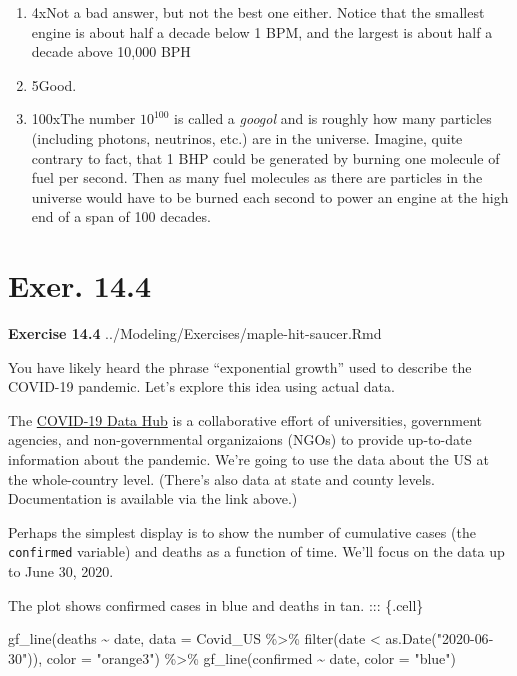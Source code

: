 \documentclass[
  letterpaper,
  DIV=11,
  numbers=noendperiod,
  oneside]{article}
\newenvironment{Shaded}{\begin{snugshade}}{\end{snugshade}}
\newcommand{\AttributeTok}[1]{\textcolor[rgb]{0.40,0.45,0.13}{#1}}
\newcommand{\FunctionTok}[1]{\textcolor[rgb]{0.28,0.35,0.67}{#1}}
\newcommand{\NormalTok}[1]{\textcolor[rgb]{0.00,0.23,0.31}{#1}}
\newcommand{\SpecialCharTok}[1]{\textcolor[rgb]{0.37,0.37,0.37}{#1}}
\newcommand{\StringTok}[1]{\textcolor[rgb]{0.13,0.47,0.30}{#1}}
\providecommand{\tightlist}{%
  \setlength{\itemsep}{0pt}\setlength{\parskip}{0pt}}\usepackage{longtable,booktabs,array}
\begin{document}
\begin{multicols}{2}
\begin{enumerate}
\def\labelenumi{\roman{enumi}.}
\tightlist
\item
  {4{xNot a bad answer, but not the best one either. Notice that the
  smallest engine is about half a decade below 1 BPM, and the largest is
  about half a decade above 10,000 BPH}}\\
\item
  {5{Good.~}}\\
\item
  {100{xThe number \(10^{100}\) is called a \emph{googol} and is
  roughly how many particles (including photons, neutrinos, etc.) are in
  the universe. Imagine, quite contrary to fact, that 1 BHP could be
  generated by burning one molecule of fuel per second. Then as many
  fuel molecules as there are particles in the universe would have to be
  burned each second to power an engine at the high end of a span of 100
  decades.}}
\end{enumerate}

\hypertarget{exer.-14.4}{%
\section*{Exer. 14.4}\label{exer.-14.4}}

\textbf{Exercise 14.4} ../Modeling/Exercises/maple-hit-saucer.Rmd

You have likely heard the phrase ``exponential growth'' used to describe
the COVID-19 pandemic. Let's explore this idea using actual data.

The \href{https://covid19datahub.io/}{COVID-19 Data Hub} is a
collaborative effort of universities, government agencies, and
non-governmental organizaions (NGOs) to provide up-to-date information
about the pandemic. We're going to use the data about the US at the
whole-country level. (There's also data at state and county levels.
Documentation is available via the link above.)

Perhaps the simplest display is to show the number of cumulative cases
(the \texttt{confirmed} variable) and deaths as a function of time.
We'll focus on the data up to June 30, 2020.

The plot shows confirmed cases in blue and deaths in tan. ::: \{.cell\}

\begin{Shaded}
\begin{Highlighting}[]
\FunctionTok{gf\_line}\NormalTok{(deaths }\SpecialCharTok{\textasciitilde{}}\NormalTok{ date, }
        \AttributeTok{data =}\NormalTok{ Covid\_US }\SpecialCharTok{\%\textgreater{}\%} \FunctionTok{filter}\NormalTok{(date }\SpecialCharTok{\textless{}} \FunctionTok{as.Date}\NormalTok{(}\StringTok{"2020{-}06{-}30"}\NormalTok{)), }
        \AttributeTok{color =} \StringTok{"orange3"}\NormalTok{) }\SpecialCharTok{\%\textgreater{}\%}
  \FunctionTok{gf\_line}\NormalTok{(confirmed }\SpecialCharTok{\textasciitilde{}}\NormalTok{ date, }\AttributeTok{color =} \StringTok{"blue"}\NormalTok{)}
\end{Highlighting}
\end{Shaded}


\end{multicols}
\end{document}

